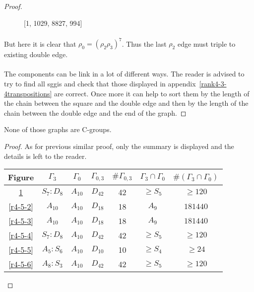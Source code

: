 \begin{proof}
\begin{figure}[H]
\begin{center}
\begin{tikzpicture}[scale=.8]
      \end{tikzpicture}
      \caption{[1, 1029, 8827, 994]}
      \label{r4-5-1}
    \end{center}
  \end{figure}

  \paragraph{}
  But here it is clear that $\rho_0 = (\rho_2 \rho_3)^7$. Thus the last $\rho_2$ edge must triple to existing double edge.

  \paragraph{}
  The components can be link in a lot of different ways. The reader is advised to try to find all sggis and check that those displayed in appendix~\ref{rank4-3-4transpositions} are correct. Once more it can help to sort them by the length of the chain between the square and the double edge and then by the length of the chain between the double edge and the end of the graph.

\end{proof}

\begin{theorem}
  None of those graphs are C-groups.
\end{theorem}

\begin{proof}
  As for previous similar proof, only the summary is displayed and the details is left to the reader.

  \begin{table}[H]
    \centering
    \begin{tabular}{|c|c|c|c|c|c|c|}
      \hline
      Figure & $\Gamma_3$ & $\Gamma_0$ & $\Gamma_{0,3}$ & $\#\Gamma_{0,3}$ & $\Gamma_3 \cap \Gamma_0$ & $\#(\Gamma_3 \cap \Gamma_0)$ \\ \hline

      \ref{r4-5-1} & $S_7 : D_8$ & $A_{10}$ & $D_{42}$ & 42 & $\ge S_5$ & $\ge 120$ \\ \hline
      \ref{r4-5-2} & $A_{10}$ & $A_{10}$ & $D_{18}$ & 18 & $A_9$ & $181440$ \\ \hline
      \ref{r4-5-3} & $A_{10}$ & $A_{10}$ & $D_{18}$ & 18 & $A_9$ & $181440$ \\ \hline
      \ref{r4-5-4} & $S_7 : D_8$ & $A_{10}$ & $D_{42}$ & 42 & $\ge S_5$ & $\ge 120$ \\ \hline
      \ref{r4-5-5} & $A_5 : S_6$ & $A_{10}$ & $D_{10}$ & 10 & $\ge S_4$ & $\ge 24$ \\ \hline
      \ref{r4-5-6} & $A_8 : S_3$ & $A_{10}$ & $D_{42}$ & 42 & $\ge S_5$ & $\ge 120$ \\ \hline

    \end{tabular}
  \end{table}
\end{proof}
